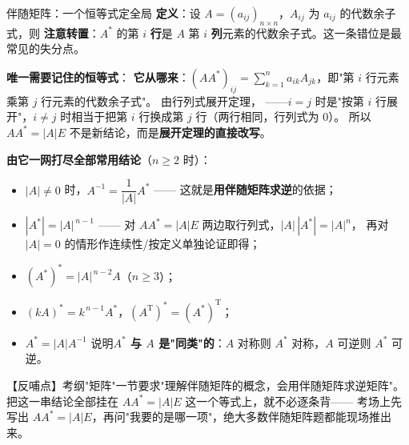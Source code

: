 \begin{fdeep}{伴随矩阵：一个恒等式定全局}
\textbf{定义}：设 $A=(a_{ij})_{n\times n}$，$A_{ij}$ 为 $a_{ij}$ 的代数余子式，则
\textbf{注意转置}：$A^{*}$ 的第 $i$ \textbf{行}是 $A$ 第 $i$ \textbf{列}元素的代数余子式。这一条错位是最常见的失分点。

\medskip
\textbf{唯一需要记住的恒等式}：
\textbf{它从哪来}：$(AA^{*})_{ij}=\sum_{k=1}^{n}a_{ik}A_{jk}$，即"第 $i$ 行元素乘第 $j$ 行元素的代数余子式"。
由行列式展开定理，
——$i=j$ 时是"按第 $i$ 行展开"，$i\ne j$ 时相当于把第 $i$ 行换成第 $j$ 行（两行相同，行列式为 $0$）。
所以 $AA^{*}=|A|E$ 不是新结论，而是\textbf{展开定理的直接改写}。

\medskip
\textbf{由它一网打尽全部常用结论}（$n\ge2$ 时）：
\begin{itemize}[leftmargin=2.2em,itemsep=0.22em]
\item $|A|\ne0$ 时，$A^{-1}=\dfrac{1}{|A|}A^{*}$ —— 这就是\textbf{用伴随矩阵求逆}的依据；
\item $|A^{*}|=|A|^{\,n-1}$ —— 对 $AA^{*}=|A|E$ 两边取行列式，$|A|\,|A^{*}|=|A|^{n}$，
      再对 $|A|=0$ 的情形作连续性/按定义单独论证即得；
\item $(A^{*})^{*}=|A|^{\,n-2}A$（$n\ge3$）；
\item $(kA)^{*}=k^{\,n-1}A^{*}$，$(A^{\mathrm{T}})^{*}=(A^{*})^{\mathrm{T}}$；
\item $A^{*}=|A|A^{-1}$ 说明\textbf{$A^{*}$ 与 $A$ 是"同类"的}：$A$ 对称则 $A^{*}$ 对称，$A$ 可逆则 $A^{*}$ 可逆。
\end{itemize}
【反哺点】考纲"矩阵"一节要求"理解伴随矩阵的概念，会用伴随矩阵求逆矩阵"。
把这一串结论全部挂在 $AA^{*}=|A|E$ 这一个等式上，就不必逐条背——
考场上先写出 $AA^{*}=|A|E$，再问"我要的是哪一项"，绝大多数伴随矩阵题都能现场推出来。
\end{fdeep}

